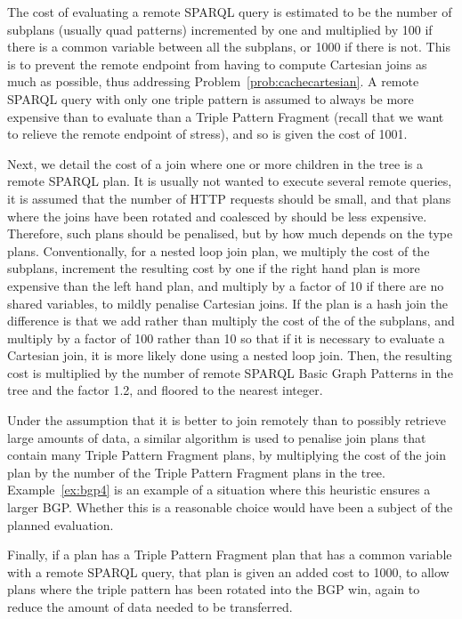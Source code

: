 The cost of evaluating a remote SPARQL query is estimated to be the
number of subplans (usually quad patterns) incremented by one and
multiplied by 100 if there is a common variable between all the
subplans, or 1000 if there is not. This is to prevent the remote
endpoint from having to compute Cartesian joins as much as possible,
thus addressing Problem~\ref{prob:cachecartesian}. A
remote SPARQL query with only one triple pattern is assumed to always
be more expensive than to evaluate than a Triple Pattern Fragment
(recall that we want to relieve the remote endpoint of stress), and so
is given the cost of 1001.


Next, we detail the cost of a join where one or more children in the
tree is a remote SPARQL plan. It is usually not wanted to execute
several remote queries, it is assumed that the number of HTTP requests
should be small, and that plans where the joins have been rotated and
coalesced by  should be
less expensive. Therefore, such plans should be penalised, but by how
much depends on the type plans. Conventionally, for a nested loop join
plan, we multiply the cost of the subplans, increment the resulting
cost by one if the right hand plan is more expensive than the left
hand plan, and multiply by a factor of 10 if there are no shared
variables, to mildly penalise Cartesian joins. If the plan is a hash
join the difference is that we add rather than multiply the cost of
the of the subplans, and multiply by a factor of 100 rather than 10 so
that if it is necessary to evaluate a Cartesian join, it is more
likely done using a nested loop join. Then, the resulting cost is
multiplied by the number of remote SPARQL Basic Graph Patterns in the
tree and the factor 1.2, and floored to the nearest integer.

Under the assumption that it is better to join remotely than to
possibly retrieve large amounts of data, a similar algorithm is used
to penalise join plans that contain many Triple Pattern Fragment
plans, by multiplying the cost of the join plan by the number of the
Triple Pattern Fragment plans in the tree. Example~\ref{ex:bgp4} is an
example of a situation where this heuristic ensures a larger
BGP. Whether this is a reasonable choice would have been a subject of
the planned evaluation.

Finally, if a plan has a Triple Pattern Fragment plan that has a
common variable with a remote SPARQL query, that plan is given an
added cost to 1000, to allow plans where the triple pattern has been
rotated into the BGP win, again to reduce the amount of data needed to
be transferred.

